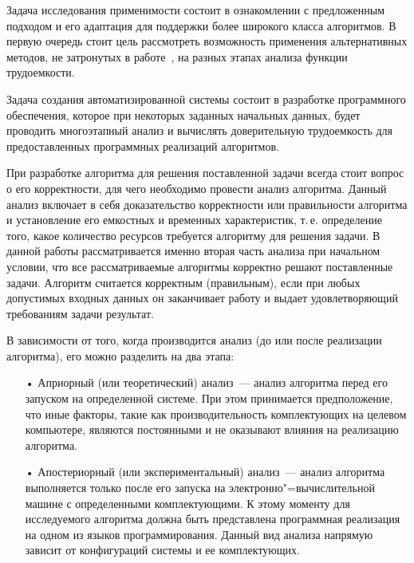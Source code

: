 \documentclass[a4paper, article, 14pt]{extarticle}
\begin{document}
Задача исследования применимости состоит в ознакомлении с предложенным подходом и его адаптация для поддержки более широкого класса алгоритмов. В первую очередь стоит цель рассмотреть возможность применения альтернативных методов, не затронутых в работе~\cite{petrushyn_ulyanov_analysis}, на разных этапах анализа функции трудоемкости.

Задача создания автоматизированной системы состоит в разработке программного обеспечения, которое при некоторых заданных начальных данных, будет проводить многоэтапный анализ и вычислять доверительную трудоемкость для предоставленных программных реализаций алгоритмов.

\label{sec:literature_review}

При разработке алгоритма для решения поставленной задачи всегда стоит вопрос о его корректности, для чего необходимо провести анализ алгоритма. Данный анализ включает в себя доказательство корректности или правильности алгоритма и установление его емкостных и временных характеристик, т.\,е. определение того, какое количество ресурсов требуется алгоритму для решения задачи. В данной работы рассматривается именно вторая часть анализа при начальном условии, что все рассматриваемые алгоритмы корректно решают поставленные задачи. Алгоритм считается корректным (правильным), если при любых допустимых входных данных он заканчивает работу и выдает удовлетворяющий требованиям задачи результат.

В зависимости от того, когда производится анализ (до или после реализации алгоритма), его можно разделить на два этапа:

\begin{enumerate}
	\item[•] Априорный (или теоретический) анализ~--- анализ алгоритма перед его запуском на определенной системе. При этом принимается предположение, что иные факторы, такие как производительность комплектующих на целевом компьютере, являются постоянными и не оказывают влияния на реализацию алгоритма.

	\item[•] Апостериорный (или экспериментальный) анализ~--- анализ алгоритма выполняется только после его запуска на электронно"=вычислительной машине с определенными комплектующими. К этому моменту для исследуемого алгоритма должна быть представлена программная реализация на одном из языков программирования. Данный вид анализа напрямую зависит от конфигураций системы и ее комплектующих.
\end{enumerate}
\end{document}

